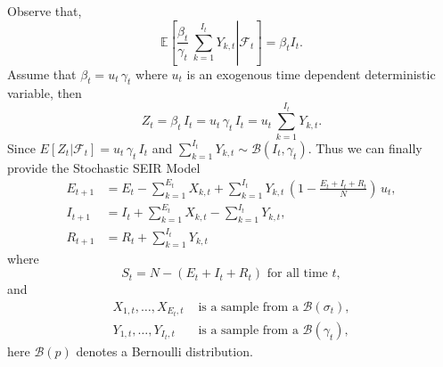 \documentclass[12pt]{article}\usepackage[]{graphicx}\usepackage[]{color}
\begin{document}
Observe that,
$$
\mathbb{E}\left[\left. \frac{\beta_t}{\gamma_t} \, \sum_{k=1}^{I_t} Y_{k,t}  \right| \mathcal{F}_t \right] 
=  \beta_t I_t.
$$
Assume that $\beta_t = u_t \,  \gamma_t$ where $u_t$ is an exogenous time dependent deterministic variable, then
$$
Z_t = \beta_t \, I_t = u_t \, \gamma_t\, I_t  = u_t \, \sum_{k=1}^{I_t} Y_{k,t}.
$$
Since $E[Z_t|\mathcal{F}_t] = u_t \, \gamma_t\, I_t$ and
$\sum_{k=1}^{I_t} Y_{k,t} \sim \mathcal{B}(I_t,\gamma_t).$ 
Thus we can finally provide the Stochastic SEIR Model
\begin{align}
E_{t+1} & = E_t - \sum_{k=1}^{E_t} X_{k,t} +  \sum_{k=1}^{I_t} Y_{k,t} \, \left( 1- \frac{E_t+I_t+R_t}{N} \right)  \, u_t , \\
I_{t+1} & = I_t + \sum_{k=1}^{E_t} X_{k,t}  - \sum_{k=1}^{I_t} Y_{k,t}, \\
R_{t+1} & = R_t + \sum_{k=1}^{I_t} Y_{k,t}
\end{align}
where 
$$
S_{t} = N-(E_t+I_t+R_t) \text{ for all time }t,
$$
and
\begin{align*}
X_{1,t},\ldots,X_{E_t,t} & \text{ is a sample from a } \mathcal{B}(\sigma_t), \\
Y_{1,t},\ldots,Y_{I_t,t} & \text{ is a sample from a } \mathcal{B}(\gamma_t),
\end{align*}
here $\mathcal{B}(p)$ denotes a Bernoulli distribution.
\end{document}
